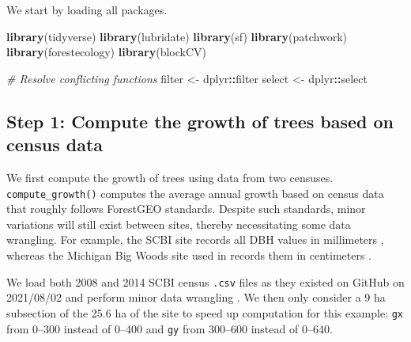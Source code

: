 \documentclass[12pt]{article}
\newenvironment{Shaded}{\begin{snugshade}}{\end{snugshade}}
\newcommand{\CommentTok}[1]{\textcolor[rgb]{0.56,0.35,0.01}{\textit{#1}}}
\newcommand{\KeywordTok}[1]{\textcolor[rgb]{0.13,0.29,0.53}{\textbf{#1}}}
\newcommand{\NormalTok}[1]{#1}
\newcommand{\OperatorTok}[1]{\textcolor[rgb]{0.81,0.36,0.00}{\textbf{#1}}}
\newcommand{\StringTok}[1]{\textcolor[rgb]{0.31,0.60,0.02}{#1}}
\begin{document}
We start by loading all packages.

\begin{Shaded}
\begin{Highlighting}[]
\KeywordTok{library}\NormalTok{(tidyverse)}
\KeywordTok{library}\NormalTok{(lubridate)}
\KeywordTok{library}\NormalTok{(sf)}
\KeywordTok{library}\NormalTok{(patchwork)}
\KeywordTok{library}\NormalTok{(forestecology)}
\KeywordTok{library}\NormalTok{(blockCV)}

\CommentTok{# Resolve conflicting functions}
\NormalTok{filter <-}\StringTok{ }\NormalTok{dplyr}\OperatorTok{::}\NormalTok{filter}
\NormalTok{select <-}\StringTok{ }\NormalTok{dplyr}\OperatorTok{::}\NormalTok{select}
\end{Highlighting}
\end{Shaded}

\hypertarget{compute-growth}{%
\subsection{Step 1: Compute the growth of trees based on census
data}\label{compute-growth}}

We first compute the growth of trees using data from two censuses.
\texttt{compute\_growth()} computes the average annual growth based on
census data that roughly follows ForestGEO standards. Despite such
standards, minor variations will still exist between sites, thereby
necessitating some data wrangling. For example, the SCBI site records
all DBH values in millimeters \citep{bourg_initial_2013}, whereas the
Michigan Big Woods site used in \citet{allen_permutation_2020} records
them in centimeters \citep{allen_michigan_2020}.

We load both 2008 and 2014 SCBI census \texttt{.csv} files as they
existed on GitHub on 2021/08/02 and perform minor data wrangling
\citep{gonzalez-akre_scbi-forestgeoscbi-forestgeo-data_2020}. We then
only consider a 9 ha subsection of the 25.6 ha of the site to speed up
computation for this example: \texttt{gx} from 0--300 instead of 0--400
and \texttt{gy} from 300--600 instead of 0--640.
\end{document}
